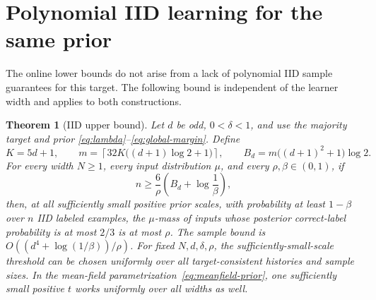 \documentclass[11pt]{article}
\newtheorem{theorem}{Theorem}
\begin{document}
\section{Polynomial IID learning for the same prior}

The online lower bounds do not arise from a lack of polynomial IID
sample guarantees for this target. The following bound is independent
of the learner width and applies to both constructions.

\begin{theorem}[IID upper bound]\label{thm:iid}
Let $d$ be odd, $0<\delta<1$, and use the majority target and prior
\eqref{eq:lambda}--\eqref{eq:global-margin}. Define
\[
 K=5d+1,\qquad
 m=\left\lceil32K\bigl((d+1)\log2+1\bigr)\right\rceil,
 \qquad B_d=m\bigl((d+1)^2+1\bigr)\log2.
\]
For every width $N\ge1$, every input distribution $\mu$, and every
$\rho,\beta\in(0,1)$, if
\begin{equation}\label{eq:iid-n}
 n\ge\frac6\rho\left(B_d+\log\frac1\beta\right),
\end{equation}
then, at all sufficiently small positive prior scales, with probability
at least $1-\beta$ over $n$ IID labeled examples, the $\mu$-mass of
inputs whose posterior correct-label probability is at most $2/3$
is at most $\rho$.
The sample bound is $O((d^4+\log(1/\beta))/\rho)$.
For fixed $N,d,\delta,\rho$, the sufficiently-small-scale threshold
can be chosen uniformly over all target-consistent histories and
sample sizes. In the mean-field parametrization~\eqref{eq:meanfield-prior},
one sufficiently small positive $t$ works uniformly over all widths
as well.
\end{theorem}
\end{document}
